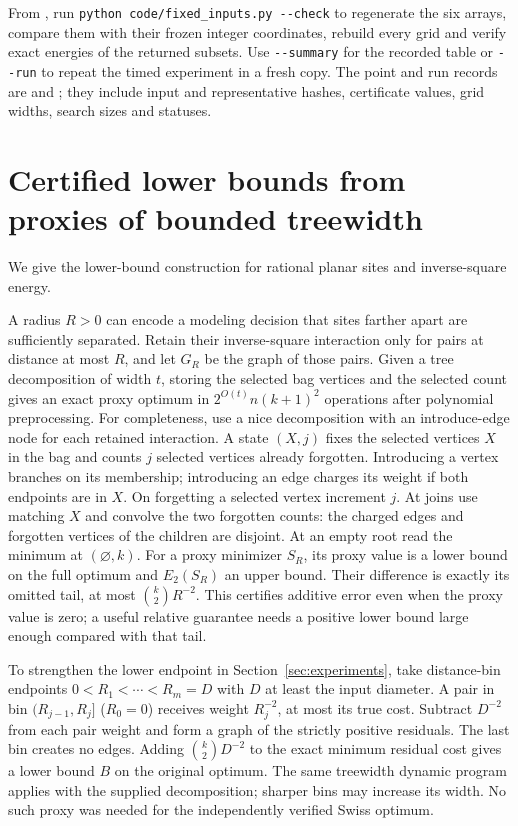 \documentclass[a4paper,12pt]{article}
\numberwithin{equation}{section}
\begin{document}
From , run \verb|python code/fixed_inputs.py --check| to regenerate
the six arrays, compare them with their frozen integer coordinates, rebuild every grid and
verify exact energies of the returned subsets. Use \verb|--summary| for the recorded table or
\verb|--run| to repeat the timed experiment in a fresh copy. The point and run records are
 and ; they include
input and representative hashes, certificate values, grid widths, search sizes and statuses.

\section{Certified lower bounds from proxies of bounded treewidth}\label{sec:structure-short}
We give the lower-bound construction for rational planar sites and inverse-square energy.

A radius $R>0$ can encode a modeling decision that sites farther apart are sufficiently separated.
Retain their inverse-square interaction only for pairs at distance at most $R$, and let $G_R$ be
the graph of those pairs. Given a tree decomposition of width $t$, storing the selected bag
vertices and the selected count gives an exact proxy optimum in $2^{O(t)}n(k+1)^2$ operations
after polynomial preprocessing. For completeness, use a nice decomposition with an introduce-edge
node for
each retained interaction. A state $(X,j)$ fixes the selected vertices $X$ in
the bag and counts $j$ selected vertices already forgotten. Introducing a vertex
branches on its membership; introducing an edge charges its weight if both
endpoints are in $X$. On forgetting a selected vertex increment $j$. At joins
use matching $X$ and convolve the two forgotten counts: the charged edges
and forgotten vertices of the children are disjoint. At an empty root read
the minimum at $(\varnothing,k)$. For a proxy minimizer $S_R$, its proxy value is a lower bound on
the full optimum and $E_2(S_R)$ an upper bound. Their difference is exactly its omitted tail, at
most $\binom{k}{2}R^{-2}$. This certifies additive error even when the proxy value is zero; a
useful relative guarantee needs a positive lower bound large enough compared with that tail.

To strengthen the lower endpoint in Section~\ref{sec:experiments}, take distance-bin endpoints
$0<R_1<\cdots<R_m=D$ with $D$ at least the input diameter. A pair in bin $(R_{j-1},R_j]$ ($R_0=0$)
receives weight $R_j^{-2}$, at most its true cost. Subtract $D^{-2}$ from each pair weight and
form a graph of the strictly positive residuals. The last bin creates no edges. Adding
$\binom{k}{2}D^{-2}$ to the exact minimum residual cost gives a lower bound $B$ on the original
optimum. The same treewidth dynamic program applies with the supplied decomposition; sharper bins
may increase its width. No such proxy was needed for the independently verified Swiss optimum.
\end{document}
